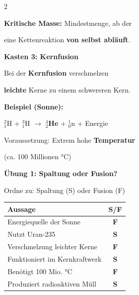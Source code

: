 \documentclass[10pt, a4paper]{article}
\newcommand{\fachfarbe}{physik}
\newcommand{\lsg}[1]{\textcolor{loesung}{\textbf{#1}}}
\newcommand{\abschnitt}[1]{%
    \vspace{8pt}\noindent\textbf{\textcolor{\fachfarbe}{#1}}\vspace{4pt}
}
\begin{document}
\begin{multicols}{2}
\begin{merksatz}
\vspace{6pt}

\textbf{Kritische Masse:} Mindestmenge, ab der

eine Kettenreaktion \lsg{von selbst abläuft}.
\end{merksatz}

\vspace{6pt}


\abschnitt{Kasten 3: Kernfusion}

\begin{merksatz}
Bei der \textbf{Kernfusion} verschmelzen

\lsg{leichte} Kerne zu einem schwereren Kern.

\vspace{6pt}

\textbf{Beispiel (Sonne):}

$^{2}_{1}$H + $^{3}_{1}$H $\rightarrow$ \lsg{$^{4}_{2}$He} + $^{1}_{0}$n + Energie

\vspace{6pt}

Voraussetzung: Extrem hohe \lsg{Temperatur}

(ca. 100 Millionen °C)
\end{merksatz}

\columnbreak


\abschnitt{Übung 1: Spaltung oder Fusion?}

Ordne zu: Spaltung (S) oder Fusion (F)

\vspace{4pt}
\begin{tabular}{|p{4.5cm}|c|}
\hline
\textbf{Aussage} & \textbf{S/F} \\
\hline
Energiequelle der Sonne & \lsg{F} \\
\hline
Nutzt Uran-235 & \lsg{S} \\
\hline
Verschmelzung leichter Kerne & \lsg{F} \\
\hline
Funktioniert im Kernkraftwerk & \lsg{S} \\
\hline
Benötigt 100 Mio. °C & \lsg{F} \\
\hline
Produziert radioaktiven Müll & \lsg{S} \\
\hline
\end{tabular}


\end{multicols}
\end{document}
